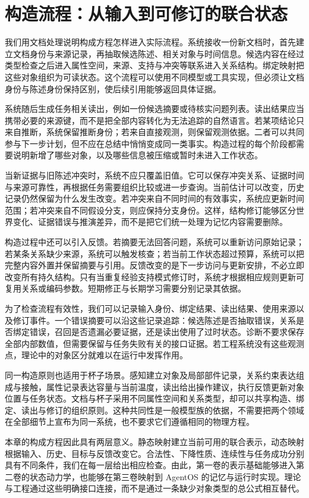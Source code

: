 \section{构造流程：从输入到可修订的联合状态}
\label{sec:genesis_algorithm}

我们用文档处理说明构成方程怎样进入实际流程。系统接收一份新文档时，首先建立文档身份与来源记录，再抽取候选陈述、相关对象与时间信息。候选内容在经过类型检查之后进入属性空间，来源、支持与冲突等联系进入关系结构。绑定映射把这些对象组织为可读状态。这个流程可以使用不同模型或工具实现，但必须让文档身份与陈述身份保持区别，使后续引用能够返回具体证据。

系统随后生成任务相关读出，例如一份候选摘要或待核实问题列表。读出结果应当携带必要的来源键，而不是把全部内容转化为无法追踪的自然语言。若某项结论只来自推断，系统保留推断身份；若来自直接观测，则保留观测依据。二者可以共同参与下一步计划，但不应在总结中悄悄变成同一类事实。构造过程的每个阶段都需要说明新增了哪些对象，以及哪些信息被压缩或暂时未进入工作状态。

当新证据与旧陈述冲突时，系统不应只覆盖旧值。它可以保存冲突关系、证据时间与来源可靠性，再根据任务需要组织比较或进一步查询。当前估计可以改变，历史记录仍然保留为什么发生改变。若冲突来自不同时间的有效事实，系统应更新时间范围；若冲突来自不同假设分支，则应保持分支身份。这样，结构修订能够区分世界变化、证据错误与推演差异，而不是把它们统一处理为记忆内容需要删除。

构造过程中还可以引入反馈。若摘要无法回答问题，系统可以重新访问原始记录；若某条关系缺少来源，系统可以触发核查；若当前工作状态超过预算，系统可以把完整内容外置并保留摘要与引用。反馈改变的是下一步访问与更新安排，不必立即改变所有持久结构。只有当重复经验支持模式修订时，系统才根据相应规则更新可复用关系或编码参数。短期修正与长期学习需要分别记录其依据。

为了检查流程有效性，我们可以记录输入身份、绑定结果、读出结果、使用来源以及修订事件。一个错误摘要可以沿这些记录追踪：候选陈述是否抽取错误，关系是否绑定错误，召回是否遗漏必要证据，还是读出使用了过时状态。诊断不要求保存全部内部数值，但需要保留与任务失败有关的接口证据。若工程系统没有这些观测点，理论中的对象区分就难以在运行中发挥作用。

同一构造原则也适用于杯子场景。感知建立对象及局部部件记录，关系约束表达组成与接触，属性记录表达容量与当前温度，读出给出操作建议，执行反馈更新对象位置与任务状态。文档与杯子采用不同属性空间和关系类型，却可以共享构造、绑定、读出与修订的组织原则。这种共同性是一般模型族的依据，不需要把两个领域在全部细节上宣布为同一系统，也不要求它们遵循相同的物理方程。

本章的构成方程因此具有两层意义。静态映射建立当前可用的联合表示，动态映射根据输入、历史、目标与反馈改变它。合法性、下降性质、连续性与任务成功分别具有不同条件，我们在每一层给出相应检查。由此，第一卷的表示基础能够进入第二卷的状态动力学，也能够在第三卷映射到 AgentOS 的记忆与运行时实现。理论与工程通过这些明确接口连接，而不是通过一条缺少对象类型的总公式相互替代。
